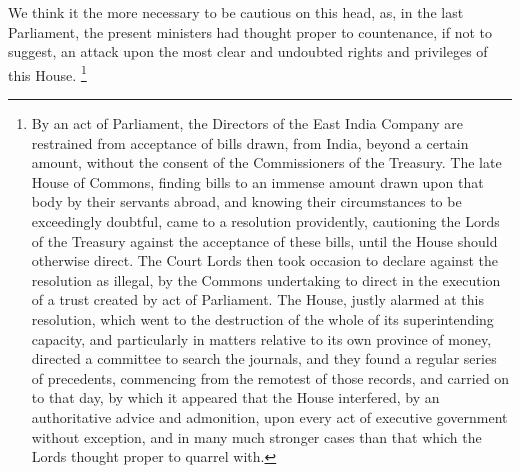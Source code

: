 We think it the more necessary to be cautious on this head, as, in the last Parliament, the present ministers had thought proper to countenance, if not to suggest, an attack upon the most clear and undoubted rights and privileges of this House.
\footnote{ By an act of Parliament, the Directors of the East India Company are restrained from acceptance of bills drawn, from India, beyond a certain amount, without the consent of the Commissioners of the Treasury. The late House of Commons, finding bills to an immense amount drawn upon that body by their servants abroad, and knowing their circumstances to be exceedingly doubtful, came to a resolution providently, cautioning the Lords of the Treasury against the acceptance of these bills, until the House should otherwise direct. The Court Lords then took occasion to declare against the resolution as illegal, by the Commons undertaking to direct in the execution of a trust created by act of Parliament. The House, justly alarmed at this resolution, which went to the destruction of the whole of its superintending capacity, and particularly in matters relative to its own province of money, directed a committee to search the journals, and they found a regular series of precedents, commencing from the remotest of those records, and carried on to that day, by which it appeared that the House interfered, by an authoritative advice and admonition, upon every act of executive government without exception, and in many much stronger cases than that which the Lords thought proper to quarrel with.}


